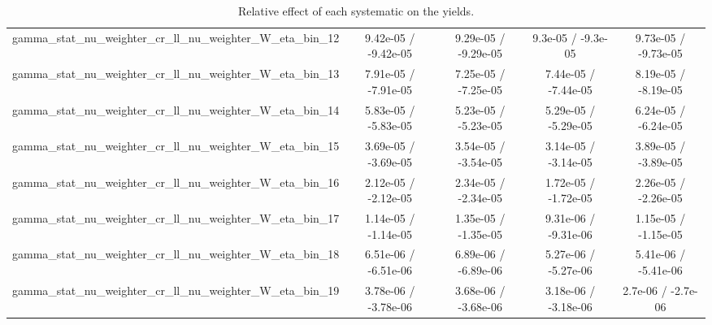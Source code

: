 \documentclass[10pt]{article}
\begin{document}
\begin{table}[htbp]
\begin{center}
\begin{tabular}{|c|c|c|c|c|}
  gamma_stat_nu_weighter_cr_ll_nu_weighter_W_eta_bin_12 & 9.42e-05 / -9.42e-05 & 9.29e-05 / -9.29e-05 & 9.3e-05 / -9.3e-05 & 9.73e-05 / -9.73e-05 \\ 
  gamma_stat_nu_weighter_cr_ll_nu_weighter_W_eta_bin_13 & 7.91e-05 / -7.91e-05 & 7.25e-05 / -7.25e-05 & 7.44e-05 / -7.44e-05 & 8.19e-05 / -8.19e-05 \\ 
  gamma_stat_nu_weighter_cr_ll_nu_weighter_W_eta_bin_14 & 5.83e-05 / -5.83e-05 & 5.23e-05 / -5.23e-05 & 5.29e-05 / -5.29e-05 & 6.24e-05 / -6.24e-05 \\ 
  gamma_stat_nu_weighter_cr_ll_nu_weighter_W_eta_bin_15 & 3.69e-05 / -3.69e-05 & 3.54e-05 / -3.54e-05 & 3.14e-05 / -3.14e-05 & 3.89e-05 / -3.89e-05 \\ 
  gamma_stat_nu_weighter_cr_ll_nu_weighter_W_eta_bin_16 & 2.12e-05 / -2.12e-05 & 2.34e-05 / -2.34e-05 & 1.72e-05 / -1.72e-05 & 2.26e-05 / -2.26e-05 \\ 
  gamma_stat_nu_weighter_cr_ll_nu_weighter_W_eta_bin_17 & 1.14e-05 / -1.14e-05 & 1.35e-05 / -1.35e-05 & 9.31e-06 / -9.31e-06 & 1.15e-05 / -1.15e-05 \\ 
  gamma_stat_nu_weighter_cr_ll_nu_weighter_W_eta_bin_18 & 6.51e-06 / -6.51e-06 & 6.89e-06 / -6.89e-06 & 5.27e-06 / -5.27e-06 & 5.41e-06 / -5.41e-06 \\ 
  gamma_stat_nu_weighter_cr_ll_nu_weighter_W_eta_bin_19 & 3.78e-06 / -3.78e-06 & 3.68e-06 / -3.68e-06 & 3.18e-06 / -3.18e-06 & 2.7e-06 / -2.7e-06 \\ 
\hline 
\end{tabular} 
\caption{Relative effect of each systematic on the yields.} 
\end{center} 
\end{table} 
\end{document}
